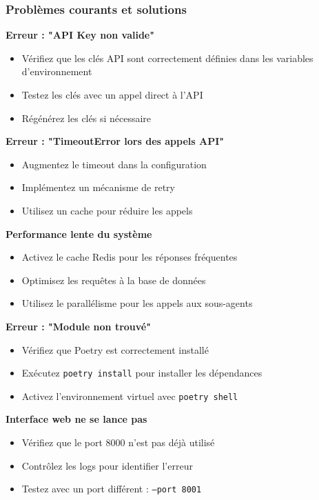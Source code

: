 \subsubsection{Problèmes courants et solutions}

\textbf{Erreur : "API Key non valide"}
\begin{itemize}
    \item Vérifiez que les clés API sont correctement définies dans les variables d'environnement
    \item Testez les clés avec un appel direct à l'API
    \item Régénérez les clés si nécessaire
\end{itemize}

\textbf{Erreur : "TimeoutError lors des appels API"}
\begin{itemize}
    \item Augmentez le timeout dans la configuration
    \item Implémentez un mécanisme de retry
    \item Utilisez un cache pour réduire les appels
\end{itemize}

\textbf{Performance lente du système}
\begin{itemize}
    \item Activez le cache Redis pour les réponses fréquentes
    \item Optimisez les requêtes à la base de données
    \item Utilisez le parallélisme pour les appels aux sous-agents
\end{itemize}

\textbf{Erreur : "Module non trouvé"}
\begin{itemize}
    \item Vérifiez que Poetry est correctement installé
    \item Exécutez \texttt{poetry install} pour installer les dépendances
    \item Activez l'environnement virtuel avec \texttt{poetry shell}
\end{itemize}

\textbf{Interface web ne se lance pas}
\begin{itemize}
    \item Vérifiez que le port 8000 n'est pas déjà utilisé
    \item Contrôlez les logs pour identifier l'erreur
    \item Testez avec un port différent : \texttt{--port 8001}
\end{itemize}


